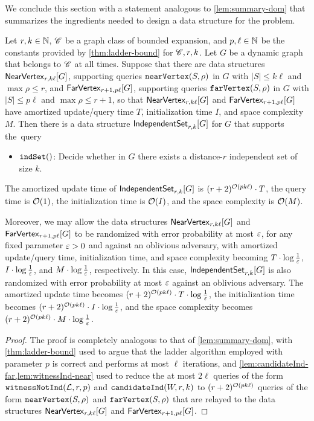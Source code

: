 We conclude this section with a statement analogous to \cref{lem:summary-dom} that summarizes the ingredients needed to design a data structure for the  problem.


\begin{lemma}\label{lem:summary-ind}
	Let $r,k\in \N$, $\Cc$ be a graph class of bounded expansion, and $p,\ell\in \N$ be the constants provided by \cref{thm:ladder-bound} for $\Cc,r,k$. Let $G$ be a dynamic graph that belongs to $\Cc$ at all times. Suppose that there are data structures $\nearVertexDS{G}{r,k\ell}$, supporting queries $\near{S,\rho}$ in $G$ with $|S|\leq k\ell$ and $\max \rho\leq r$, and $\farVertexDS{G}{r+1,p\ell}$, supporting queries $\far{S,\rho}$ in $G$ with $|S|\leq p\ell$ and $\max \rho\leq r+1$, so that $\nearVertexDS{G}{r,k\ell}$ and $\farVertexDS{G}{r+1,p\ell}$ have amortized update/query time $T$, initialization time $I$, and space complexity $M$. Then there is a data structure $\independentSetDS{G}{r,k}$ for $G$ that supports the~query
	\begin{itemize}
		\item $\is{}$: Decide whether in $G$ there exists a distance-$r$ independent set of size $k$. 
	\end{itemize}
	The amortized update time of $\independentSetDS{G}{r,k}$ is $(r+2)^{\Oh(pk\ell)}\cdot T$, the query time is $\Oh(1)$, the initialization time is $\Oh(I)$, and the space complexity is $\Oh(M)$.
	
	Moreover, we may allow the data structures $\nearVertexDS{G}{r,k\ell}$ and $\farVertexDS{G}{r+1,p\ell}$ to be randomized with error probability at most $\eps$, for any fixed parameter $\eps>0$ and against an oblivious adversary, with amortized update/query time, initialization time, and space complexity becoming $T\cdot \log \tfrac{1}{\eps}$, $I\cdot \log \tfrac{1}{\eps}$, and $M\cdot \log \tfrac{1}{\eps}$, respectively. In this case,  $\independentSetDS{G}{r,k}$ is also randomized with error probability at most $\eps$ against an oblivious adversary. The amortized update time becomes $(r+2)^{\Oh(pk\ell)}\cdot T\cdot \log\tfrac{1}{\eps}$, the initialization time becomes $(r+2)^{\Oh(pk\ell)}\cdot I\cdot \log \tfrac{1}{\eps}$, and the space complexity becomes  $(r+2)^{\Oh(pk\ell)}\cdot M\cdot \log \tfrac{1}{\eps}$.
\end{lemma}
\begin{proof}
	The proof is completely analogous to that of \cref{lem:summary-dom}, with \cref{thm:ladder-bound} used to argue that the ladder algorithm employed with parameter $p$ is correct and performs at most $\ell$ iterations, and \cref{lem:candidateInd-far,lem:witnessInd-near} used to reduce the at most $2\ell$ queries of the form $\witnessInd{\cal L,r,p}$ and $\candidateInd{W,r,k}$ to $(r+2)^{\Oh(pk\ell)}$ queries of the form $\near{S,\rho}$ and $\far{S,\rho}$ that are relayed to the data structures $\nearVertexDS{G}{r,k\ell}$ and $\farVertexDS{G}{r+1,p\ell}$. %
\end{proof}

